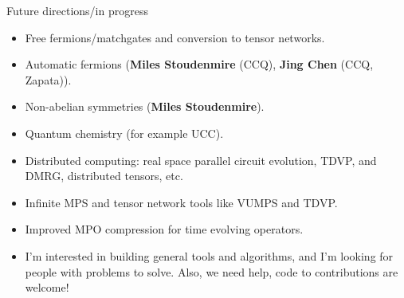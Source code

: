 \begin{frame}{Future directions/in progress}

\begin{itemize}[<+->]

  \item Free fermions/matchgates and conversion to tensor networks.
  \item Automatic fermions (\textbf{Miles Stoudenmire} (CCQ), \textbf{Jing  Chen} (CCQ, Zapata)).
  \item Non-abelian symmetries (\textbf{Miles Stoudenmire}).
  \item Quantum chemistry (for example UCC).
  \item Distributed computing: real space parallel circuit evolution, TDVP, and DMRG, distributed tensors, etc.
  \item Infinite MPS and tensor network tools like VUMPS and TDVP.
  \item Improved MPO compression for time evolving operators.
  \item I'm interested in building general tools and algorithms, and I'm looking for people with problems to solve. Also, we need help, code to contributions are welcome!

\end{itemize}

\end{frame}

